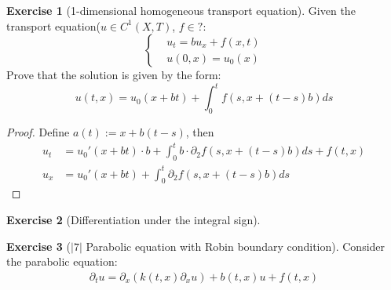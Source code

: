 \documentclass[a4paper,11pt,oneside,fleqn]{book}
\theoremstyle{definition}
\newtheorem{exercise}{Exercise}[chapter]
\theoremstyle{remark}
\begin{document}
\begin{exercise}[1-dimensional homogeneous transport equation]
Given the transport equation($u \in C^1(X, T)$, $f \in ?$:
\begin{equation*}
\left\{
\begin{aligned}
	&u_t = bu_x + f(x, t)\\
	&u(0, x) = u_0(x)
\end{aligned}
\right.
\end{equation*}
Prove that the solution is given by the form:
\begin{equation*}
	u(t, x) = u_0(x + bt) + \int_0^t f(s, x + (t - s)b) ds
\end{equation*}
\begin{proof}
	Define $a(t) := x + b(t - s)$, then
\begin{align*}
		u_t &= u_0'(x + bt) \cdot b + \int_0^t b \cdot  \partial_2 f(s, x + (t - s)b)  ds + f(t, x) \\
		u_x &= u_0'(x + bt) + \int _0^t  \partial_2 f(s, x + (t -s)b) ds
	\end{align*}
\end{proof}
\end{exercise}

\begin{exercise}[Differentiation under the integral sign]
\end{exercise}

\begin{exercise}[$|7|$ Parabolic equation with Robin boundary condition]
	Consider the parabolic equation:
	\begin{align*}
		\partial_t u = \partial_x (k(t, x) \partial_x u) + b(t, x) u + f(t, x)
	\end{align*}
\end{exercise}
\end{document}
